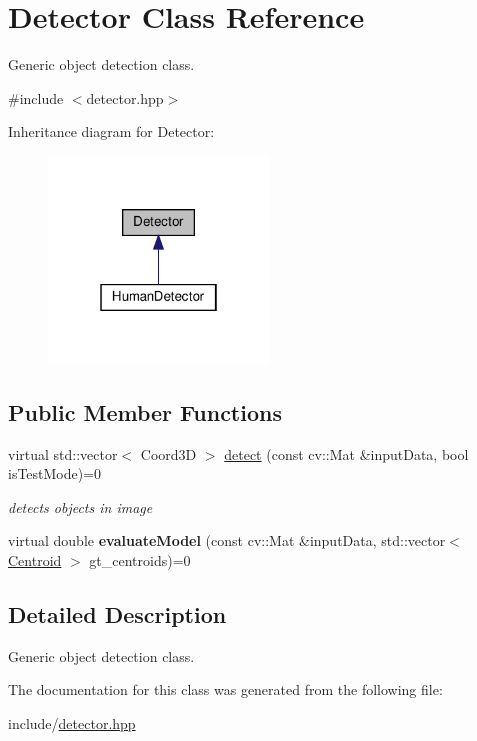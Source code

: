 \hypertarget{classDetector}{}\section{Detector Class Reference}
\label{classDetector}


Generic object detection class.  




{\ttfamily \#include $<$detector.\+hpp$>$}



Inheritance diagram for Detector\+:\nopagebreak
\begin{figure}[H]
\begin{center}
\leavevmode
\includegraphics[width=166pt]{classDetector__inherit__graph}
\end{center}
\end{figure}
\subsection*{Public Member Functions}
\begin{DoxyCompactItemize}
\item 
\mbox{\label{classDetector_afdf99890fb93a11252eef0dd85598c15}} 
virtual std\+::vector$<$ Coord3D $>$ \hyperlink{classDetector_afdf99890fb93a11252eef0dd85598c15}{detect} (const cv\+::\+Mat \&input\+Data, bool is\+Test\+Mode)=0
\begin{DoxyCompactList}\small\item\em detects objects in image \end{DoxyCompactList}\item 
\mbox{\label{classDetector_afaaefdcb9f6271dadf13fd2158e5d9be}} 
virtual double {\bfseries evaluate\+Model} (const cv\+::\+Mat \&input\+Data, std\+::vector$<$ \hyperlink{structCentroid}{Centroid} $>$ gt\+\_\+centroids)=0
\end{DoxyCompactItemize}


\subsection{Detailed Description}
Generic object detection class. 

The documentation for this class was generated from the following file\+:\begin{DoxyCompactItemize}
\item 
include/\hyperlink{detector_8hpp}{detector.\+hpp}\end{DoxyCompactItemize}
